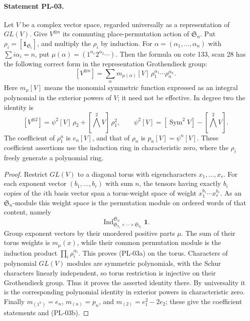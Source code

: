 \documentclass[11pt,a4paper]{article}
\begin{document}
\paragraph{Statement PL-03.}
Let $V$ be a complex vector space, regarded universally as a representation of
$GL(V)$. Give $V^{\otimes n}$ its commuting place-permutation action of
$\mathfrak S_n$. Put $\rho_i=[\mathbf1_{\mathfrak S_i}]$, and multiply the
$\rho_i$ by induction. For $\alpha=(\alpha_1,\ldots,\alpha_n)$ with
$\sum i\alpha_i=n$, put $\mu(\alpha)=(1^{\alpha_1}2^{\alpha_2}\cdots)$.
Then the formula on cote 133, scan 28 has the following correct form in the
representation Grothendieck group:
\[
 [V^{\otimes n}]=
 \sum_{\alpha}m_{\mu(\alpha)}[V]\,
          \rho_1^{\alpha_1}\cdots\rho_n^{\alpha_n}.
 \tag{PL-03a}
\]
Here $m_\mu[V]$ means the monomial symmetric function expressed as an
integral polynomial in the exterior powers of $V$; it need not be effective.
In degree two the identity is
\[
 [V^{\otimes2}]=\psi^2[V]\,\rho_2+[\bigwedge^2V]\,\rho_1^2,
 \qquad \psi^2[V]=[\operatorname{Sym}^2V]-[\bigwedge^2V].
 \tag{PL-03b}
\]
The coefficient of $\rho_1^n$ is $e_n[V]$, and that of $\rho_n$ is
$p_n[V]=\psi^n[V]$. These coefficient assertions use the induction ring in
characteristic zero, where the $\rho_i$ freely generate a polynomial ring.

\begin{proof}
Restrict $GL(V)$ to a diagonal torus with eigencharacters $x_1,\ldots,x_r$.
For each exponent vector $(b_1,\ldots,b_r)$ with sum $n$, the tensors having
exactly $b_i$ copies of the $i$th basis vector span a torus-weight space of
weight $x_1^{b_1}\cdots x_r^{b_r}$. As an $\mathfrak S_n$-module this weight
space is the permutation module on ordered words of that content, namely
\[
 \operatorname{Ind}_{\mathfrak S_{b_1}\times\cdots\times\mathfrak S_{b_r}}
              ^{\mathfrak S_n}\mathbf1.
\]
Group exponent vectors by their unordered positive parts $\mu$.
The sum of their torus weights is $m_\mu(x)$, while their common permutation
module is the induction product $\prod_i\rho_i^{\alpha_i}$.
This proves (PL-03a) on the torus. Characters of polynomial $GL(V)$ modules
are symmetric polynomials, with the Schur characters linearly independent,
so torus restriction is injective on their Grothendieck group. Thus it proves
the asserted identity there. By universality it is the corresponding
polynomial identity in exterior powers in characteristic zero.
Finally $m_{(1^n)}=e_n$, $m_{(n)}=p_n$, and
$m_{(2)}=e_1^2-2e_2$; these give the coefficient statements and (PL-03b).
\end{proof}
\end{document}
